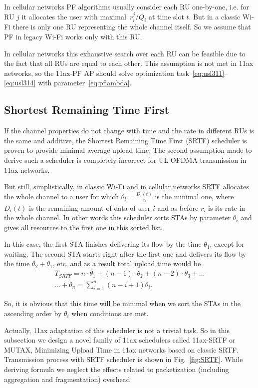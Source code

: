In cellular networks PF algorithms usually consider each RU one-by-one, i.e. for RU $j$ it allocates the user with maximal~$r_i^j / Q_i$ at time slot $t$. But in a classic Wi-Fi there is only one RU representing the whole channel itself. So we assume that PF in legacy Wi-Fi works only with this RU.

In cellular networks this exhaustive search over each RU can be feasible due to the fact that all RUs are equal to each other. This assumption is not met in 11ax networks, so the 11ax-PF AP should solve optimization task~\eqref{eq:usl311}--\eqref{eq:usl314} with parameter~\eqref{eq:pflambda}.


\subsection{Shortest Remaining Time First}

If the channel properties do not change with time and the rate in different RUs is the same and additive, the Shortest Remaining Time First (SRTF) scheduler is proven to provide minimal average upload time. 
The second assumption made to derive such a scheduler is completely incorrect for UL OFDMA transmission in 11ax networks.

But still, simplistically, in classic Wi-Fi and in cellular networks SRTF allocates the whole channel to a user for which $\theta_i=\frac{D_i(t)}{r_i}$ is the minimal one, where $D_i(t)$ is the remaining amount of data of user $i$ and as before $r_i$ is its rate in the whole channel. 
In other words this scheduler sorts STAs by parameter $\theta_i$ and gives all resources to the first one in this sorted list. 

In this case, the first STA finishes delivering its flow by the time $\theta_1$, except for waiting.
The second STA starts right after the first one and delivers its flow by the time $\theta_2 + \theta_1$, etc. and as a result total upload time would be
\begin{multline}
\label{eq:srtfuploadtime}
T_{SRTF} = n\cdot\theta_1 + (n-1)\cdot\theta_2 + (n-2)\cdot\theta_3 + \dots \\ \dots + \theta_n = \sum_{i = 1}^n (n - i + 1) \theta_i.
\end{multline}

So, it is obvious that this time will be minimal when we sort the STAs in the ascending order by $\theta_i$ when conditions are met.

Actually, 11ax adaptation of this scheduler is not a trivial task. So in this subsection we design a novel family of 11ax schedulers called 11ax-SRTF or MUTAX, Minimizing Upload Time in 11ax networks based on classic SRTF. Transmission process with SRTF scheduler is shown in Fig.~\ref{fig:SRTF}.
While deriving formula we neglect the effects related to packetization (including aggregation and fragmentation) overhead. 

